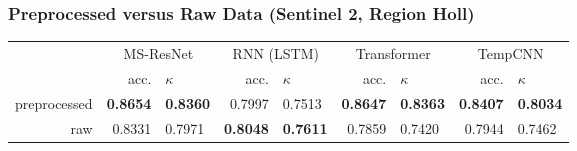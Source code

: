 \begin{frame}
\frametitle{Preprocessed versus Raw Data (Sentinel 2, Region Holl)}

\begin{tabular}{rrlrlrlrl}
	\toprule
	& \multicolumn{2}{c}{MS-ResNet} & \multicolumn{2}{c}{RNN (LSTM)} & \multicolumn{2}{c}{Transformer} & \multicolumn{2}{c}{TempCNN} \\
	& acc. & $\kappa$ & acc. & $\kappa$ & acc. & $\kappa$ & acc. & $\kappa$ \\
	\cmidrule(lr){2-3}\cmidrule(lr){4-5} \cmidrule(lr){6-7}\cmidrule(lr){8-9}
	preprocessed & \textbf{0.8654} & \textbf{0.8360} & 0.7997 & 0.7513 & \textbf{0.8647} & \textbf{0.8363} & \textbf{0.8407} & \textbf{0.8034} \\
	raw 		 & 0.8331 & 0.7971 & \textbf{0.8048} & \textbf{0.7611} & 0.7859 & 0.7420 & 0.7944 & 0.7462 \\
	\bottomrule
\end{tabular}

\end{frame}



